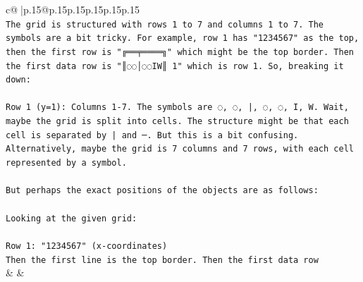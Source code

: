 \documentclass{article}
\begin{document}
{\begin{supertabular}{c@{$\;$}|p{.15\linewidth}@{}p{.15\linewidth}p{.15\linewidth}p{.15\linewidth}p{.15\linewidth}p{.15\linewidth}}
{{{\\ 
\texttt{The grid is structured with rows 1 to 7 and columns 1 to 7. The symbols are a bit tricky. For example, row 1 has "1234567" as the top, then the first row is "╔══╤════╗" which might be the top border. Then the first data row is "║◌◌│◌◌IW║ 1" which is row 1. So, breaking it down:} \\
\\ 
\texttt{Row 1 (y=1): Columns 1{-}7. The symbols are ◌, ◌, |, ◌, ◌, I, W. Wait, maybe the grid is split into cells. The structure might be that each cell is separated by | and ─. But this is a bit confusing. Alternatively, maybe the grid is 7 columns and 7 rows, with each cell represented by a symbol.} \\
\\ 
\texttt{But perhaps the exact positions of the objects are as follows:} \\
\\ 
\texttt{Looking at the given grid:} \\
\\ 
\texttt{Row 1: "1234567" (x{-}coordinates)} \\
\texttt{Then the first line is the top border. Then the first data row} \\
            }
        }
    }
    & & \\ \\


\end{supertabular}}
\end{document}

